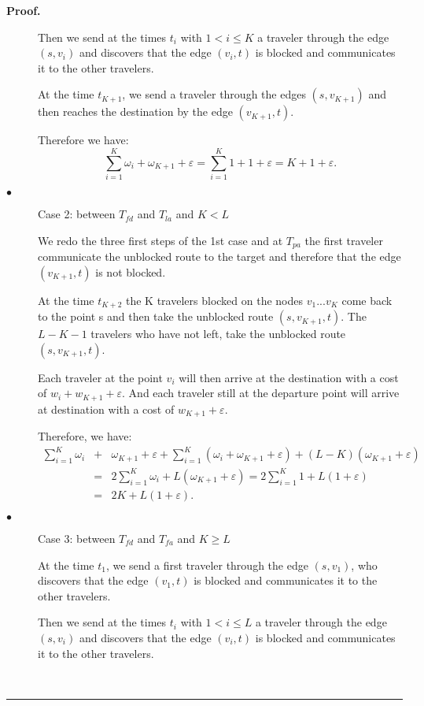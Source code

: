 \documentclass[letter-size, 11pt]{article}
\newenvironment{proof}[1][Proof]{\textbf{#1.} }{\ \rule{0.5em}{0.5em}}
\begin{document}
\begin{proof}
\begin{description}
Then we send at the times $t_i$ with $1 < i \leq K$ a traveler through the edge $(s,v_i)$ and discovers that the edge $(v_i,t)$ is blocked and communicates it to the other travelers.

At the time $t_{K+1}$, we send a traveler through the edges $(s,v_{K+1})$ and then reaches the destination by the edge $(v_{K+1},t)$. 

Therefore we have: 
\[
\sum_{i=1}^{K} \omega_{i} + \omega_{K+1} + \varepsilon = \sum_{i=1}^{K} 1 + 1 + \varepsilon = K + 1 + \varepsilon.
\]

\item[$\bullet$] Case 2: between $T_{fd}$ and $T_{la}$ and $K<L$

We redo the three first steps of the 1st case and at $ T_{pa} $ the first traveler communicate the unblocked route to the target and therefore that the edge $(v_{K+1},t)$ is not blocked.

At the time $t_{K+2}$ the K travelers blocked on the nodes $v_{1} ... v_K $ come back to the point s and then take the unblocked route $(s,v_{K+1},t)$. The $L-K-1$ travelers who have not left, take the unblocked route $(s,v_{K+1},t)$.

Each traveler at the point $v_i$ will then arrive at the destination with a cost of $w_i + w_{K+1} + \varepsilon$. And each traveler still at the departure point will arrive at destination with a cost of $w_{K+1} + \varepsilon$.

Therefore, we have:
\begin{eqnarray}
\sum_{i=1}^{K} \omega_{i} &+& \omega_{K+1} + \varepsilon + \sum_{i=1}^{K}(\omega_{i} + \omega_{K+1} + \varepsilon) + (L - K) ( \omega_{K+1} + \varepsilon ) \nonumber \\
&=& 2\sum_{i=1}^{K} \omega_{i} + L(\omega_{K+1} + \varepsilon ) = 2\sum_{i=1}^{K} 1+ L(1 + \varepsilon ) \nonumber \\
&=& 2K+ L(1 + \varepsilon ). \nonumber
\end{eqnarray}


\item[$\bullet$] Case 3: between $T_{fd}$ and $T_{fa}$ and $K \geq L$

At the time $t_1$, we send a first traveler through the edge $(s,v_1)$, who discovers that the edge $(v_1,t)$ is blocked and communicates it to the other travelers.

Then we send at the times $t_i$ with $1 < i \leq L$ a traveler through the edge $(s,v_i)$ and discovers that the edge $(v_i,t)$ is blocked and communicates it to the other travelers.


\end{description}
\end{proof}
\end{document}
